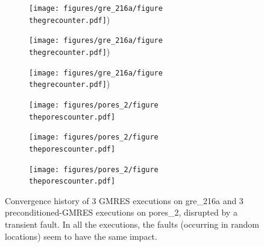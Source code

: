 \documentclass[twoside]{article}
\newcounter{fig}\setcounter{fig}{0}
\begin{document}
\begin{figure}[H]
    \begin{minipage}[b]{0.48\linewidth}
      \begin{subfigure}[t]{\linewidth}
        \centering
        \texttt{[image: figures/gre\_216a/figure\\thegrecounter.pdf]})
        \caption{}\label{fig:gre_216a_conv_hist_location_0}		
      \end{subfigure}
      \quad
      \begin{subfigure}[t]{\linewidth}
        \centering
        \texttt{[image: figures/gre\_216a/figure\\thegrecounter.pdf]})
        \caption{}\label{fig:gre_216a_conv_hist_location_1}
      \end{subfigure}
      \quad
      \begin{subfigure}[t]{\linewidth}
        \centering
        \texttt{[image: figures/gre\_216a/figure\\thegrecounter.pdf]})
        \caption{}\label{fig:gre_216a_conv_hist_location_2}
      \end{subfigure}
    \end{minipage}
    \quad
    \begin{minipage}[b]{0.48\linewidth}
      \begin{subfigure}[t]{\linewidth}
        \centering
        \texttt{[image: figures/pores\_2/figure\\theporescounter.pdf]}
        \caption{}\label{fig:pores_2_conv_hist_location_0}		
      \end{subfigure}
      \quad
      \begin{subfigure}[t]{\linewidth}
        \centering
        \texttt{[image: figures/pores\_2/figure\\theporescounter.pdf]}
        \caption{}\label{fig:pores_2_conv_hist_location_1}
      \end{subfigure}
      \quad
      \begin{subfigure}[t]{\linewidth}
        \centering
        \texttt{[image: figures/pores\_2/figure\\theporescounter.pdf]}
        \caption{}\label{fig:pores_2_conv_hist_location_2}
      \end{subfigure}

      
    \end{minipage}
    \caption{Convergence history of 3 GMRES executions on gre_216a and 3 preconditioned-GMRES executions on pores_2, disrupted by a transient fault. In all the executions, the faults (occurring in random locations) seem to have the same impact.}\label{fig:conv_hist_location}
  \end{figure}
\end{document}
